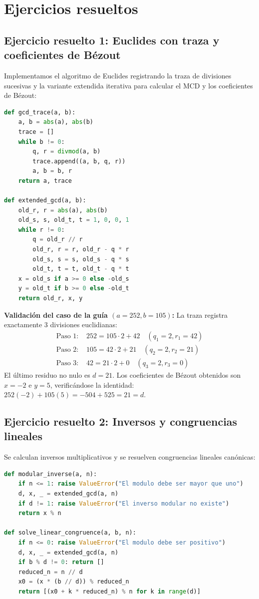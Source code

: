 \section{Ejercicios resueltos}

\subsection{Ejercicio resuelto 1: Euclides con traza y coeficientes de Bézout}
Implementamos el algoritmo de Euclides registrando la traza de divisiones sucesivas y la variante extendida iterativa para calcular el MCD y los coeficientes de Bézout:

\begin{lstlisting}[language=Python, caption={MCD con traza y Euclides extendido}, label={lst:resuelto_1}]
def gcd_trace(a, b):
    a, b = abs(a), abs(b)
    trace = []
    while b != 0:
        q, r = divmod(a, b)
        trace.append((a, b, q, r))
        a, b = b, r
    return a, trace

def extended_gcd(a, b):
    old_r, r = abs(a), abs(b)
    old_s, s, old_t, t = 1, 0, 0, 1
    while r != 0:
        q = old_r // r
        old_r, r = r, old_r - q * r
        old_s, s = s, old_s - q * s
        old_t, t = t, old_t - q * t
    x = old_s if a >= 0 else -old_s
    y = old_t if b >= 0 else -old_t
    return old_r, x, y
\end{lstlisting}

\textbf{Validación del caso de la guía $(a = 252, b = 105)$:}
La traza registra exactamente 3 divisiones euclidianas:
\begin{align*}
    \text{Paso 1: } & 252 = 105 \cdot 2 + 42 \quad (q_1 = 2, r_1 = 42) \\
    \text{Paso 2: } & 105 = 42 \cdot 2 + 21 \quad (q_2 = 2, r_2 = 21) \\
    \text{Paso 3: } & 42 = 21 \cdot 2 + 0 \quad (q_3 = 2, r_3 = 0)
\end{align*}
El último residuo no nulo es $d = 21$. Los coeficientes de Bézout obtenidos son $x = -2$ e $y = 5$, verificándose la identidad: $252(-2) + 105(5) = -504 + 525 = 21 = d$.

\subsection{Ejercicio resuelto 2: Inversos y congruencias lineales}
Se calculan inversos multiplicativos y se resuelven congruencias lineales canónicas:

\begin{lstlisting}[language=Python, caption={Inverso modular y congruencias lineales}, label={lst:resuelto_2}]
def modular_inverse(a, n):
    if n <= 1: raise ValueError("El modulo debe ser mayor que uno")
    d, x, _ = extended_gcd(a, n)
    if d != 1: raise ValueError("El inverso modular no existe")
    return x % n

def solve_linear_congruence(a, b, n):
    if n <= 0: raise ValueError("El modulo debe ser positivo")
    d, x, _ = extended_gcd(a, n)
    if b % d != 0: return []
    reduced_n = n // d
    x0 = (x * (b // d)) % reduced_n
    return [(x0 + k * reduced_n) % n for k in range(d)]
\end{lstlisting}

